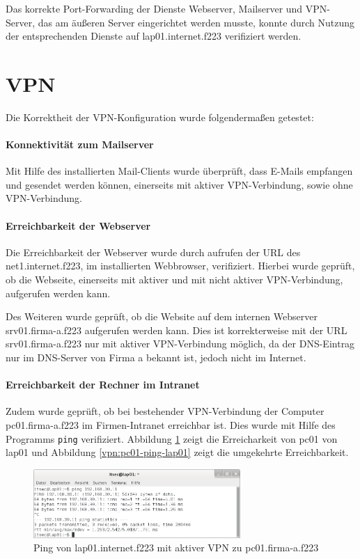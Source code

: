 Das korrekte Port-Forwarding der Dienste Webserver, Mailserver und VPN-Server, das am äußeren Server eingerichtet werden musste, konnte durch Nutzung der entsprechenden Dienste auf lap01.internet.f223 verifiziert werden.

\section{VPN}
Die Korrektheit der VPN-Konfiguration wurde folgendermaßen getestet:

\paragraph{Konnektivität zum Mailserver}
Mit Hilfe des installierten Mail-Clients wurde überprüft, dass E-Mails empfangen und gesendet werden können, einerseits mit aktiver VPN-Verbindung, sowie ohne VPN-Verbindung.

\paragraph{Erreichbarkeit der Webserver}
Die Erreichbarkeit der Webserver wurde durch aufrufen der URL des net1.internet.f223, im installierten Webbrowser, verifiziert. Hierbei wurde geprüft, ob die Webseite, einerseits mit aktiver und mit nicht aktiver VPN-Verbindung, aufgerufen werden kann.

Des Weiteren wurde geprüft, ob die Website auf dem internen Webserver srv01.firma-a.f223 aufgerufen werden kann. Dies ist korrekterweise mit der URL srv01.firma-a.f223 nur mit aktiver VPN-Verbindung möglich, da der DNS-Eintrag nur im DNS-Server von Firma a bekannt ist, jedoch nicht im Internet.

\paragraph{Erreichbarkeit der Rechner im Intranet}
Zudem wurde geprüft, ob bei bestehender VPN-Verbindung der Computer pc01.firma-a.f223 im Firmen-Intranet erreichbar ist. Dies wurde mit Hilfe des Programms \texttt{ping} verifiziert. Abbildung \ref{vpn:lap01-ping-pc01} zeigt die Erreicharkeit von pc01 von lap01 und Abbildung \ref{vpn:pc01-ping-lap01} zeigt die umgekehrte Erreichbarkeit.

\begin{figure}[h!]
  \centering
    \includegraphics[width=0.7\textwidth]{figures/vpn_lap01_ping_pc01.png}
  \caption{Ping von lap01.internet.f223 mit aktiver VPN zu pc01.firma-a.f223}
  \label{vpn:lap01-ping-pc01}
\end{figure}

